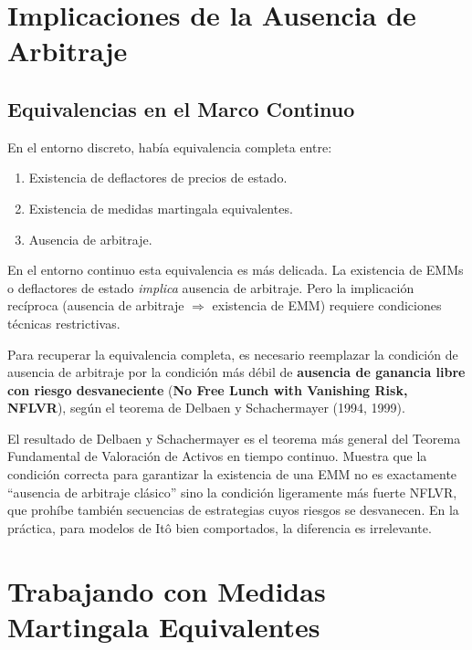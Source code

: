 \documentclass[12pt]{article}
\begin{document}
\section{Implicaciones de la Ausencia de Arbitraje}

\subsection{Equivalencias en el Marco Continuo}

En el entorno discreto, hab\'ia equivalencia completa entre:
\begin{enumerate}
  \item Existencia de deflactores de precios de estado.
  \item Existencia de medidas martingala equivalentes.
  \item Ausencia de arbitraje.
\end{enumerate}

En el entorno continuo esta equivalencia es m\'as delicada. La existencia de EMMs o deflactores de estado \textit{implica} ausencia de arbitraje. Pero la implicaci\'on rec\'iproca (ausencia de arbitraje $\Rightarrow$ existencia de EMM) requiere condiciones t\'ecnicas restrictivas.

Para recuperar la equivalencia completa, es necesario reemplazar la condici\'on de ausencia de arbitraje por la condici\'on m\'as d\'ebil de \textbf{ausencia de ganancia libre con riesgo desvaneciente} (\textbf{No Free Lunch with Vanishing Risk, NFLVR}), seg\'un el teorema de Delbaen y Schachermayer (1994, 1999).

\begin{intuicion}
El resultado de Delbaen y Schachermayer es el teorema m\'as general del Teorema Fundamental de Valoraci\'on de Activos en tiempo continuo. Muestra que la condici\'on correcta para garantizar la existencia de una EMM no es exactamente ``ausencia de arbitraje cl\'asico'' sino la condici\'on ligeramente m\'as fuerte NFLVR, que proh\'ibe tambi\'en secuencias de estrategias cuyos riesgos se desvanecen. En la pr\'actica, para modelos de It\^o bien comportados, la diferencia es irrelevante.
\end{intuicion}

\section{Trabajando con Medidas Martingala Equivalentes}
\end{document}
